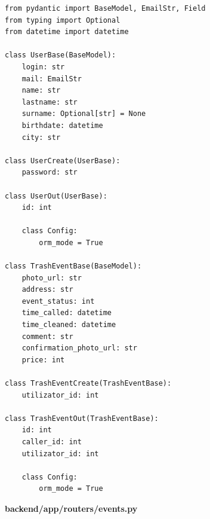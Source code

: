 \documentclass[coursework]{SCWorks}
\begin{document}
\begin{verbatim}
from pydantic import BaseModel, EmailStr, Field
from typing import Optional
from datetime import datetime

class UserBase(BaseModel):
    login: str
    mail: EmailStr
    name: str
    lastname: str
    surname: Optional[str] = None
    birthdate: datetime
    city: str

class UserCreate(UserBase):
    password: str

class UserOut(UserBase):
    id: int

    class Config:
        orm_mode = True

class TrashEventBase(BaseModel):
    photo_url: str
    address: str
    event_status: int
    time_called: datetime
    time_cleaned: datetime
    comment: str
    confirmation_photo_url: str
    price: int

class TrashEventCreate(TrashEventBase):
    utilizator_id: int

class TrashEventOut(TrashEventBase):
    id: int
    caller_id: int
    utilizator_id: int

    class Config:
        orm_mode = True
\end{verbatim}

\begin{center}
\textbf{backend/app/routers/events.py}
\end{center}
\end{document}
